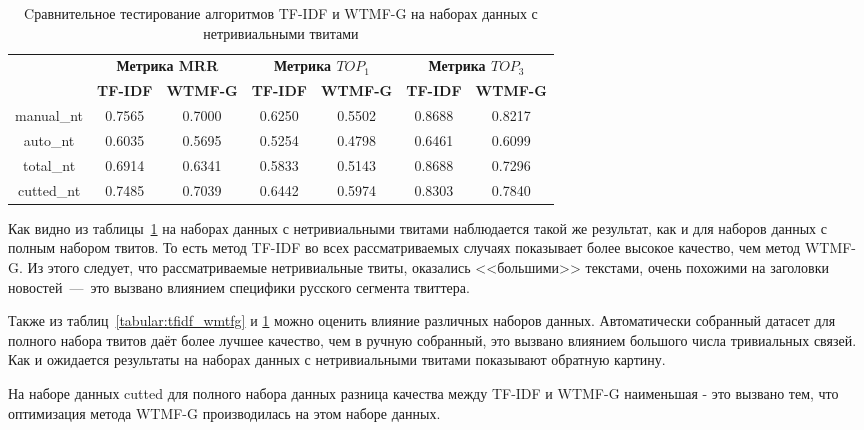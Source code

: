     \begin{table}[ht!]
    \caption{Cравнительное тестирование алгоритмов TF-IDF и WTMF-G на наборах данных с нетривиальными твитами \bigskip}
    \centering

    \label{tabular:tfidf_wmtfg_nt}
        \begin{tabular}{|c|c|c|c|c|c|c|}
            \hline
            \bf{\multirow{2}{*}{\specialcell{Набор данных}}} &
            \multicolumn{2}{|c|}{\bf{Метрика MRR}} &
            \multicolumn{2}{|c|}{\bf{Метрика $TOP_1$}} &
            \multicolumn{2}{|c|}{\bf{Метрика $TOP_3$}} \\ \cline{2-7}
            & \bf{TF-IDF} & \bf{WTMF-G} & \bf{TF-IDF} & \bf{WTMF-G} & \bf{TF-IDF} & \bf{WTMF-G} \\ \hline
            manual\_nt & 0.7565 & 0.7000 & 0.6250 & 0.5502 & 0.8688 & 0.8217 \\ \hline
            auto\_nt   & 0.6035 & 0.5695 & 0.5254 & 0.4798 & 0.6461 & 0.6099 \\ \hline
            total\_nt  & 0.6914 & 0.6341 & 0.5833 & 0.5143 & 0.8688 & 0.7296 \\ \hline
            cutted\_nt & 0.7485 & 0.7039 & 0.6442 & 0.5974 & 0.8303 & 0.7840 \\ \hline
        \end{tabular}
    \end{table}

    Как видно из таблицы~\ref{tabular:tfidf_wmtfg_nt} на наборах данных с нетривиальными твитами наблюдается такой же результат, как и для наборов данных с полным набором твитов.
    То есть метод TF-IDF во всех рассматриваемых случаях показывает более высокое качество, чем метод WTMF-G.
    Из этого следует, что рассматриваемые нетривиальные твиты, оказались <<большими>> текстами, очень похожими на заголовки новостей~---~это вызвано влиянием специфики русского сегмента
    твиттера.

    Также из таблиц~\ref{tabular:tfidf_wmtfg} и \ref{tabular:tfidf_wmtfg_nt} можно оценить влияние различных наборов данных.
    Автоматически собранный датасет для полного набора твитов даёт более лучшее качество, чем в ручную собранный, это вызвано влиянием большого числа тривиальных связей. Как и ожидается
    результаты на наборах данных с нетривиальными твитами показывают обратную картину.

    На наборе данных cutted для полного набора данных разница качества между TF-IDF и WTMF-G наименьшая - это вызвано тем, что оптимизация метода WTMF-G производилась на этом наборе данных.

